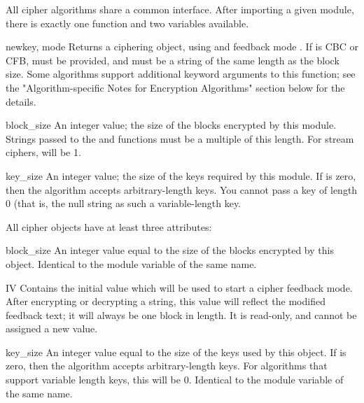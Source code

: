 \documentclass{howto}
\begin{document}
All cipher algorithms share a common interface.  After importing a
given module, there is exactly one function and two variables
available.

\begin{funcdesc}{new}{key, mode}
Returns a ciphering object, using  and feedback mode
.  If  is CBC or CFB,  must be provided,
and must be a string of the same length as the block size.  Some
algorithms support additional keyword arguments to this function; see
the "Algorithm-specific Notes for Encryption Algorithms" section below for the details.
\end{funcdesc}

\begin{datadesc}{block_size}
An integer value; the size of the blocks encrypted by this module.
Strings passed to the  and  functions
must be a multiple of this length.  For stream ciphers,
 will be 1. 
\end{datadesc}

\begin{datadesc}{key_size}
An integer value; the size of the keys required by this module.  If
 is zero, then the algorithm accepts arbitrary-length
keys.  You cannot pass a key of length 0 (that is, the null string
 as such a variable-length key.  
\end{datadesc}

All cipher objects have at least three attributes:

\begin{datadesc}{block_size}
An integer value equal to the size of the blocks encrypted by this object.
Identical to the module variable of the same name.
\end{datadesc}

\begin{datadesc}{IV}
Contains the initial value which will be used to start a cipher
feedback mode.  After encrypting or decrypting a string, this value
will reflect the modified feedback text; it will always be one block
in length.  It is read-only, and cannot be assigned a new value.
\end{datadesc}

\begin{datadesc}{key_size}
An integer value equal to the size of the keys used by this object.  If
 is zero, then the algorithm accepts arbitrary-length
keys.  For algorithms that support variable length keys, this will be 0.
Identical to the module variable of the same name.  
\end{datadesc}
\end{document}

